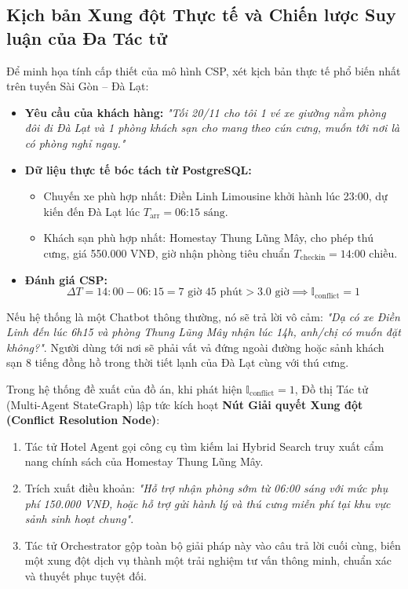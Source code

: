 \subsection{Kịch bản Xung đột Thực tế và Chiến lược Suy luận của Đa Tác tử}
\label{subsec:real_world_conflict}

Để minh họa tính cấp thiết của mô hình CSP, xét kịch bản thực tế phổ biến nhất trên tuyến Sài Gòn -- Đà Lạt:
\begin{itemize}
    \item \textbf{Yêu cầu của khách hàng:} \textit{"Tối 20/11 cho tôi 1 vé xe giường nằm phòng đôi đi Đà Lạt và 1 phòng khách sạn cho mang theo cún cưng, muốn tới nơi là có phòng nghỉ ngay."}
    \item \textbf{Dữ liệu thực tế bóc tách từ PostgreSQL:}
    \begin{itemize}
        \item Chuyến xe phù hợp nhất: Điền Linh Limousine khởi hành lúc 23:00, dự kiến đến Đà Lạt lúc $T_{\text{arr}} = \text{06:15 sáng}$.
        \item Khách sạn phù hợp nhất: Homestay Thung Lũng Mây, cho phép thú cưng, giá 550.000 VNĐ, giờ nhận phòng tiêu chuẩn $T_{\text{checkin}} = \text{14:00 chiều}$.
    \end{itemize}
    \item \textbf{Đánh giá CSP:}
    \begin{equation}
    \Delta T = 14:00 - 06:15 = 7\text{ giờ } 45\text{ phút} > 3.0\text{ giờ} \implies \mathbb{I}_{\text{conflict}} = 1
    \end{equation}
\end{itemize}

Nếu hệ thống là một Chatbot thông thường, nó sẽ trả lời vô cảm: \textit{"Dạ có xe Điền Linh đến lúc 6h15 và phòng Thung Lũng Mây nhận lúc 14h, anh/chị có muốn đặt không?"}. Người dùng tới nơi sẽ phải vất vả đứng ngoài đường hoặc sảnh khách sạn 8 tiếng đồng hồ trong thời tiết lạnh của Đà Lạt cùng với thú cưng.

Trong hệ thống đề xuất của đồ án, khi phát hiện $\mathbb{I}_{\text{conflict}} = 1$, Đồ thị Tác tử (Multi-Agent StateGraph) lập tức kích hoạt \textbf{Nút Giải quyết Xung đột (Conflict Resolution Node)}:
\begin{enumerate}
    \item Tác tử Hotel Agent gọi công cụ tìm kiếm lai Hybrid Search truy xuất cẩm nang chính sách của Homestay Thung Lũng Mây.
    \item Trích xuất điều khoản: \textit{"Hỗ trợ nhận phòng sớm từ 06:00 sáng với mức phụ phí 150.000 VNĐ, hoặc hỗ trợ gửi hành lý và thú cưng miễn phí tại khu vực sảnh sinh hoạt chung"}.
    \item Tác tử Orchestrator gộp toàn bộ giải pháp này vào câu trả lời cuối cùng, biến một xung đột dịch vụ thành một trải nghiệm tư vấn thông minh, chuẩn xác và thuyết phục tuyệt đối.
\end{enumerate}
